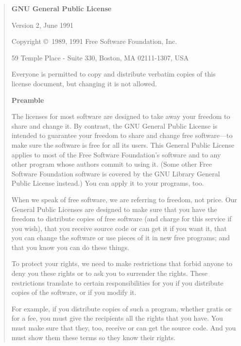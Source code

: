 \documentclass[twoside,11pt]{article}
\renewcommand{\_}{\texttt{\symbol{95}}}
\newcommand{\latexonlysmall}{\small}
\newcommand{\latexonlysmall}{}
\begin{document}
\begin{quote}
\latexonlysmall
\begin{center}\textbf{GNU General Public License}\end{center}

\begin{center}
{\parindent 0in

Version 2, June 1991

Copyright \copyright\ 1989, 1991 Free Software Foundation, Inc.

\bigskip

59 Temple Place - Suite 330, Boston, MA  02111-1307, USA

\bigskip

Everyone is permitted to copy and distribute verbatim copies
of this license document, but changing it is not allowed.
}
\end{center}

\begin{center}
{\bf\large Preamble}
\end{center}


The licenses for most software are designed to take away your freedom to
share and change it.  By contrast, the GNU General Public License is
intended to guarantee your freedom to share and change free software---to
make sure the software is free for all its users.  This General Public
License applies to most of the Free Software Foundation's software and to
any other program whose authors commit to using it.  (Some other Free
Software Foundation software is covered by the GNU Library General Public
License instead.)  You can apply it to your programs, too.

When we speak of free software, we are referring to freedom, not price.
Our General Public Licenses are designed to make sure that you have the
freedom to distribute copies of free software (and charge for this service
if you wish), that you receive source code or can get it if you want it,
that you can change the software or use pieces of it in new free programs;
and that you know you can do these things.

To protect your rights, we need to make restrictions that forbid anyone to
deny you these rights or to ask you to surrender the rights.  These
restrictions translate to certain responsibilities for you if you
distribute copies of the software, or if you modify it.

For example, if you distribute copies of such a program, whether gratis or
for a fee, you must give the recipients all the rights that you have.  You
must make sure that they, too, receive or can get the source code.  And
you must show them these terms so they know their rights.


\end{quote}
\end{document}
